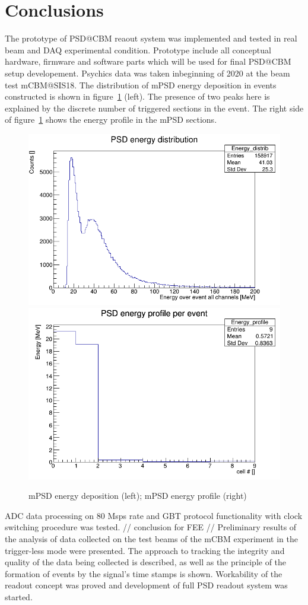 \documentclass[a4paper,11pt]{article}
\begin{document}
\section{Conclusions}
The prototype of PSD@CBM reaout system was implemented and tested in real beam and DAQ experimental condition. Prototype include all conceptual hardware, firmware and software parts which will be used for final PSD@CBM setup developement. Psychics data was taken inbeginning of 2020 at the beam test mCBM@SIS18.
The distribution of mPSD energy deposition in events constructed is shown in figure~\ref{fig:7} (left). The presence of two peaks here is explained by the discrete number of triggered sections in the event. The right side of figure~\ref{fig:7} shows the energy profile in the mPSD sections.

\begin{figure}[htbp]
\centering %
\includegraphics[width=.45\textwidth]{PsdEdepInEvent_calibrd.png}
\qquad
\includegraphics[width=.45\textwidth]{PsdEprofileInEvent_calibrd.png}
\caption{\label{fig:7} mPSD energy deposition (left); mPSD energy profile (right)}
\end{figure}

ADC data processing on 80 Msps rate and GBT protocol functionality with clock switching procedure was tested. 
// conclusion for FEE //
Preliminary results of the analysis of data collected on the test beams of the mCBM experiment in the trigger-less mode were presented. The approach to tracking the integrity and quality of the data being collected is described, as well as the principle of the formation of events by the signal's time stamps is shown.
Workability of the readout concept was proved and development of full PSD readout system was started.
\end{document}
